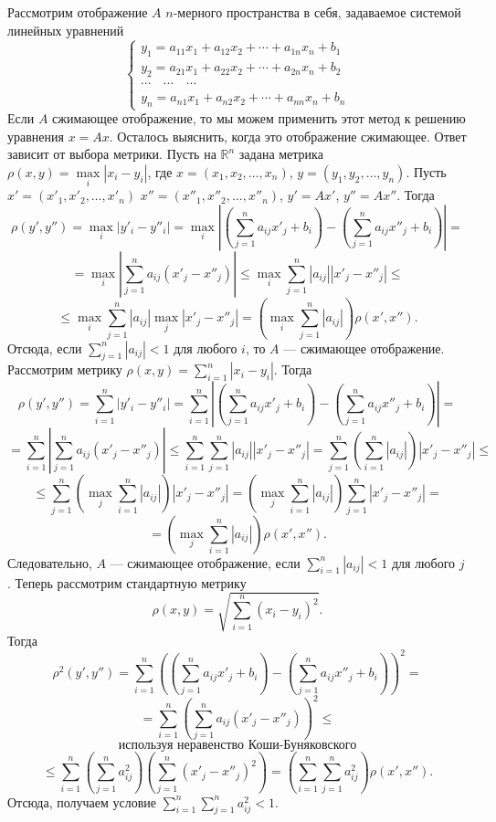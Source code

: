 \documentclass[12pt, titlepage, oneside]{amsbook}
\newcommand{\RR}{\mathbb{R}}
\theoremstyle{definition}
\theoremstyle{remark}
\begin{document}
Рассмотрим отображение $A$ $n$-мерного пространства в себя, задаваемое системой линейных уравнений $$\begin{cases} y_1=a_{11}x_1+a_{12}x_2+\cdots+a_{1n}x_n+b_1 \\
		y_2=a_{21}x_1+a_{22}x_2+\cdots+a_{2n}x_n+b_2 \\
		\cdots\quad\cdots\quad\cdots                 \\
		y_n=a_{n1}x_1+a_{n2}x_2+\cdots+a_{nn}x_n+b_n\end{cases}$$
Если $A$ сжимающее отображение, то мы можем применить этот метод к решению уравнения $x=Ax$. Осталось выяснить, когда это отображение сжимающее. Ответ зависит от выбора метрики. Пусть на $\RR^n$ задана метрика $\rho(x,y)=\max\limits_i |x_i-y_i|$, где $x=(x_1,x_2,\ldots,x_n)$, $y=(y_1,y_2,\ldots,y_n)$. Пусть $x'=(x'_1,x'_2,\ldots,x'_n)$ $x''=(x''_1,x''_2,\ldots,x''_n)$, $y'=Ax'$, $y''=Ax''$. Тогда $$\rho(y',y'')=\max\limits_i |y'_i-y''_i|=\max\limits_i \left|\left(\sum\limits_{j=1}^n a_{ij}x'_j+b_i\right)-\left(\sum\limits_{j=1}^n a_{ij}x''_j+b_i\right)\right|=$$ $$=\max\limits_i \left|\sum\limits_{j=1}^n a_{ij}(x'_j-x''_j)\right|\leq\max\limits_i\sum\limits_{j=1}^n|a_{ij}||x'_j-x''_j|\leq$$ $$\leq\max\limits_i\sum\limits_{j=1}^n|a_{ij}|\max\limits_j |x'_j-x''_j|=\left(\max\limits_i\sum\limits_{j=1}^n|a_{ij}|\right)\rho(x',x'').$$ Отсюда, если $\sum\limits_{j=1}^n|a_{ij}|<1$ для любого $i$, то $A$ --- сжимающее отображение. Рассмотрим метрику $\rho(x,y)=\sum\limits_{i=1}^n |x_i-y_i|$. Тогда $$\rho(y',y'')=\sum\limits_{i=1}^n  |y'_i-y''_i|=\sum\limits_{i=1}^n  \left|\left(\sum\limits_{j=1}^n a_{ij}x'_j+b_i\right)-\left(\sum\limits_{j=1}^n a_{ij}x''_j+b_i\right)\right|=$$
$$=\sum\limits_{i=1}^n \left|\sum\limits_{j=1}^n a_{ij}(x'_j-x''_j)\right|\leq\sum\limits_{i=1}^n \sum\limits_{j=1}^n |a_{ij}| |x'_j-x''_j|=\sum\limits_{j=1}^n\left(\sum\limits_{i=1}^n |a_{ij}|\right)|x'_j-x''_j|\leq$$
$$\leq\sum\limits_{j=1}^n\left(\max\limits_j\sum\limits_{i=1}^n |a_{ij}|\right)|x'_j-x''_j|=\left(\max\limits_j\sum\limits_{i=1}^n |a_{ij}|\right)\sum\limits_{j=1}^n|x'_j-x''_j|=$$ $$=\left(\max\limits_j\sum\limits_{i=1}^n |a_{ij}|\right)\rho(x',x'').$$ Следовательно, $A$ --- сжимающее отображение, если $\sum\limits_{i=1}^n|a_{ij}|<1$ для любого $j$.
Теперь рассмотрим стандартную метрику $$\rho(x,y)=\sqrt{\sum\limits_{i=1}^n(x_i-y_i)^2}.$$ Тогда $$\rho^2(y',y'')=\sum\limits_{i=1}^n\left(\left(\sum\limits_{j=1}^n a_{ij}x'_j+b_i\right)-\left(\sum\limits_{j=1}^n a_{ij}x''_j+b_i\right)\right)^2=$$ $$=\sum\limits_{i=1}^n\left(\sum\limits_{j=1}^n a_{ij}(x'_j-x''_j)\right)^2\leq$$ $$\text{ используя неравенство Коши-Буняковского }$$ $$\leq\sum\limits_{i=1}^n\left(\sum\limits_{j=1}^n a^2_{ij}\right)\left(\sum\limits_{j=1}^n (x'_j-x''_j)^2\right)=\left(\sum\limits_{i=1}^n\sum\limits_{j=1}^n a^2_{ij}\right)\rho(x',x'').$$ Отсюда, получаем условие $\sum\limits_{i=1}^n\sum\limits_{j=1}^n a^2_{ij}<1$.
\end{document}
